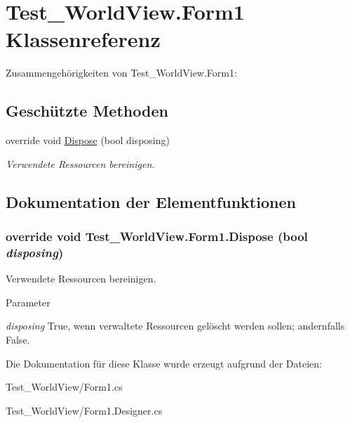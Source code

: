 \hypertarget{class_test___world_view_1_1_form1}{
\section{Test\_\-WorldView.Form1 Klassenreferenz}
\label{class_test___world_view_1_1_form1}
}


Zusammengehörigkeiten von Test\_\-WorldView.Form1:\subsection*{Geschützte Methoden}
\begin{DoxyCompactItemize}
\item 
override void \hyperlink{class_test___world_view_1_1_form1_aeb423a166a4e2a2273b5b825f12ecc2d}{Dispose} (bool disposing)
\begin{DoxyCompactList}\small\item\em Verwendete Ressourcen bereinigen. \item\end{DoxyCompactList}\end{DoxyCompactItemize}


\subsection{Dokumentation der Elementfunktionen}
\hypertarget{class_test___world_view_1_1_form1_aeb423a166a4e2a2273b5b825f12ecc2d}{
\subsubsection[{Dispose}]{\setlength{\rightskip}{0pt plus 5cm}override void Test\_\-WorldView.Form1.Dispose (bool {\em disposing})}}
\label{class_test___world_view_1_1_form1_aeb423a166a4e2a2273b5b825f12ecc2d}


Verwendete Ressourcen bereinigen. 


\begin{DoxyParams}{Parameter}
\item[{\em disposing}]True, wenn verwaltete Ressourcen gelöscht werden sollen; andernfalls False.\end{DoxyParams}


Die Dokumentation für diese Klasse wurde erzeugt aufgrund der Dateien:\begin{DoxyCompactItemize}
\item 
Test\_\-WorldView/Form1.cs\item 
Test\_\-WorldView/Form1.Designer.cs\end{DoxyCompactItemize}
